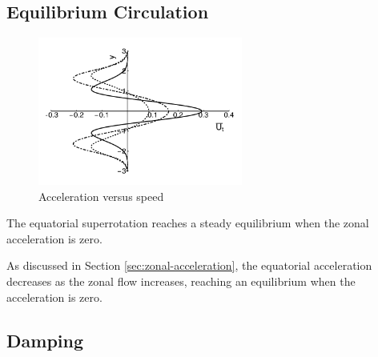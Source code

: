 \subsection{Equilibrium Circulation}

\begin{figure}
  \centering
  \includegraphics[width=0.6\textwidth]{figures/wave-mean-flow/accn-vs-u.pdf}
  \caption{Acceleration versus speed}
  \label{fig:accn-vs-u}
\end{figure}

The equatorial superrotation reaches a steady equilibrium when the zonal acceleration is zero.

As discussed in Section \ref{sec:zonal-acceleration}, the equatorial acceleration decreases as the zonal flow increases, reaching an equilibrium when the acceleration is zero.

\subsection{Damping}


